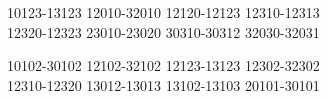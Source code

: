 \begingroup\footnotesize\ttfamily\begin{flushleft}
10123-13123 12010-32010 12120-12123 12310-12313\\
12320-12323 23010-23020 30310-30312 32030-32031\\
\end{flushleft}\endgroup
\begingroup\footnotesize\ttfamily\begin{flushleft}
10102-30102 12102-32102 12123-13123 12302-32302\\
12310-12320 13012-13013 13102-13103 20101-30101\\
\end{flushleft}\endgroup

